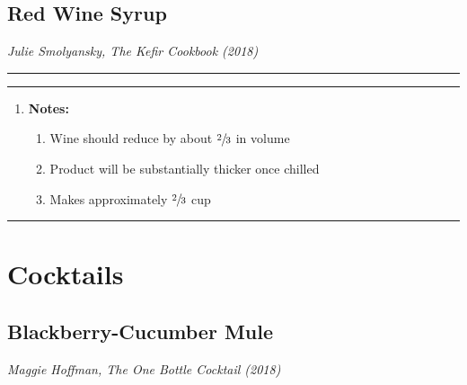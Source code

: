 \documentclass[10pt,a4paper]{article}
\begin{document}
\subsection{Red Wine Syrup}
\textit{Julie Smolyansky, The Kefir Cookbook (2018)}

\rule{\textwidth}{0.4pt}
\vskip 0.025in
\rule{\textwidth}{0.4pt}
\begin{enumerate}[]
    \item \textbf{Notes:}
    \begin{enumerate}[-]
    \item Wine should reduce by about $\sfrac{2}{3}$ in volume
    \item Product will be substantially thicker once chilled
    \item Makes approximately $\sfrac{2}{3}$ cup
    \end{enumerate}
\end{enumerate}
\rule{\textwidth}{0.4pt}
\vfill
\newpage

\section{Cocktails}
\subsection{Blackberry-Cucumber Mule}
\textit{Maggie Hoffman, The One Bottle Cocktail (2018)}
\end{document}

